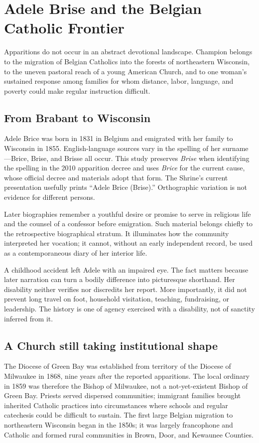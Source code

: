 \section{Adele Brise and the Belgian Catholic Frontier}

Apparitions do not occur in an abstract devotional landscape. Champion belongs to the migration of Belgian Catholics into the forests of northeastern Wisconsin, to the uneven pastoral reach of a young American Church, and to one woman's sustained response among families for whom distance, labor, language, and poverty could make regular instruction difficult.

\subsection{From Brabant to Wisconsin}

Adele Brice was born in 1831 in Belgium and emigrated with her family to Wisconsin in 1855. English-language sources vary in the spelling of her surname---Brice, Brise, and Brisse all occur. This study preserves \emph{Brise} when identifying the spelling in the 2010 apparition decree and uses \emph{Brice} for the current cause, whose official decree and materials adopt that form. The Shrine's current presentation usefully prints “Adele Brice (Brise).” Orthographic variation is not evidence for different persons.

Later biographies remember a youthful desire or promise to serve in religious life and the counsel of a confessor before emigration. Such material belongs chiefly to the retrospective biographical stratum. It illuminates how the community interpreted her vocation; it cannot, without an early independent record, be used as a contemporaneous diary of her interior life.

A childhood accident left Adele with an impaired eye. The fact matters because later narration can turn a bodily difference into picturesque shorthand. Her disability neither verifies nor discredits her report. More importantly, it did not prevent long travel on foot, household visitation, teaching, fundraising, or leadership. The history is one of agency exercised with a disability, not of sanctity inferred from it.

\subsection{A Church still taking institutional shape}

The Diocese of Green Bay was established from territory of the Diocese of Milwaukee in 1868, nine years after the reported apparitions. The local ordinary in 1859 was therefore the Bishop of Milwaukee, not a not-yet-existent Bishop of Green Bay. Priests served dispersed communities; immigrant families brought inherited Catholic practices into circumstances where schools and regular catechesis could be difficult to sustain. The first large Belgian migration to northeastern Wisconsin began in the 1850s; it was largely francophone and Catholic and formed rural communities in Brown, Door, and Kewaunee Counties.

